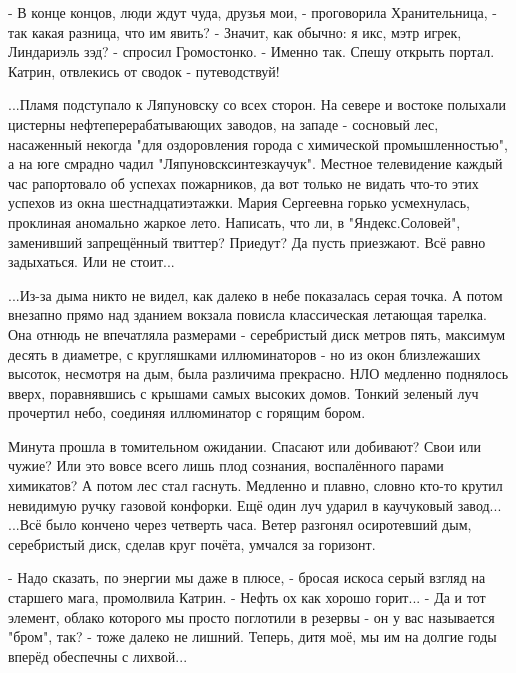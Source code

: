  - В конце концов, люди ждут чуда, друзья мои, - проговорила Хранительница, - так какая разница, что им явить?
 - Значит, как обычно: я икс, мэтр игрек, Линдариэль зэд? - спросил Громостонко.
 - Именно так. Спешу открыть портал. Катрин, отвлекись от сводок - путеводствуй!


...Пламя подступало к Ляпуновску со всех сторон. На севере и востоке полыхали цистерны нефтеперерабатывающих заводов, на западе - сосновый лес, насаженный некогда "для оздоровления города с химической промышленностью", а на юге смрадно чадил "Ляпуновсксинтезкаучук". Местное телевидение каждый час рапортовало об успехах пожарников, да вот только не видать что-то этих успехов из окна шестнадцатиэтажки.
Мария Сергеевна горько усмехнулась, проклиная аномально жаркое лето. Написать, что ли, в "Яндекс.Соловей", заменивший запрещённый твиттер? Приедут? Да пусть приезжают. Всё равно задыхаться. Или не стоит...

...Из-за дыма никто не видел, как далеко в небе показалась серая точка. А потом внезапно прямо над зданием вокзала повисла классическая летающая тарелка. Она отнюдь не впечатляла размерами - серебристый диск метров пять, максимум десять в диаметре, с кругляшками иллюминаторов - но из окон близлежаших высоток, несмотря на дым, была различима прекрасно. НЛО медленно поднялось вверх, поравнявшись с крышами самых высоких домов. Тонкий зеленый луч прочертил небо, соединяя иллюминатор с горящим бором.

Минута прошла в томительном ожидании. Спасают или добивают? Свои или чужие? Или это вовсе всего лишь плод сознания, воспалённого парами химикатов? А потом лес стал гаснуть. Медленно и плавно, словно кто-то крутил невидимую ручку газовой конфорки. Ещё один луч ударил в каучуковый завод...
...Всё было кончено через четверть часа. Ветер разгонял осиротевший дым, серебристый диск, сделав круг почёта, умчался за горизонт.


 - Надо сказать, по энергии мы даже в плюсе, - бросая искоса серый взгляд на старшего мага, промолвила Катрин. - Нефть ох как хорошо горит...
 - Да и тот элемент, облако которого мы просто поглотили в резервы - он у вас называется "бром", так? - тоже далеко не лишний. Теперь, дитя моё, мы им на долгие годы вперёд обеспечны с лихвой...






